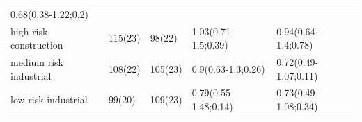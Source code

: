 \documentclass[
]{article}
\begin{document}
\begin{longtable}[]{@{}lllll@{}}
\begin{minipage}[t]{0.23\columnwidth}
0.68(0.38-1.22;0.2)\strut
\end{minipage}\tabularnewline
\begin{minipage}[t]{0.20\columnwidth}\raggedright
high-risk construction\strut
\end{minipage} & \begin{minipage}[t]{0.08\columnwidth}\raggedright
115(23)\strut
\end{minipage} & \begin{minipage}[t]{0.10\columnwidth}\raggedright
98(22)\strut
\end{minipage} & \begin{minipage}[t]{0.24\columnwidth}\raggedright
1.03(0.71-1.5;0.39)\strut
\end{minipage} & \begin{minipage}[t]{0.23\columnwidth}\raggedright
0.94(0.64-1.4;0.78)\strut
\end{minipage}\tabularnewline
\begin{minipage}[t]{0.20\columnwidth}\raggedright
medium risk industrial\strut
\end{minipage} & \begin{minipage}[t]{0.08\columnwidth}\raggedright
108(22)\strut
\end{minipage} & \begin{minipage}[t]{0.10\columnwidth}\raggedright
105(23)\strut
\end{minipage} & \begin{minipage}[t]{0.24\columnwidth}\raggedright
0.9(0.63-1.3;0.26)\strut
\end{minipage} & \begin{minipage}[t]{0.23\columnwidth}\raggedright
0.72(0.49-1.07;0.11)\strut
\end{minipage}\tabularnewline
\begin{minipage}[t]{0.20\columnwidth}\raggedright
low risk industrial\strut
\end{minipage} & \begin{minipage}[t]{0.08\columnwidth}\raggedright
99(20)\strut
\end{minipage} & \begin{minipage}[t]{0.10\columnwidth}\raggedright
109(23)\strut
\end{minipage} & \begin{minipage}[t]{0.24\columnwidth}\raggedright
0.79(0.55-1.48;0.14)\strut
\end{minipage} & \begin{minipage}[t]{0.23\columnwidth}\raggedright
0.73(0.49-1.08;0.34)\strut
\end{minipage}\tabularnewline

\end{longtable}
\end{document}
